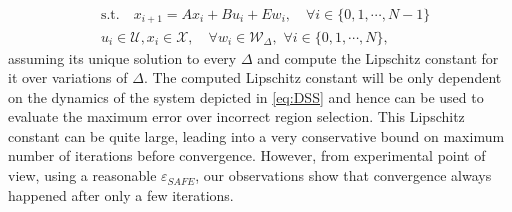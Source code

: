 {\begin{align*}
&\text{s.t.} \quad x_{i+1}=Ax_i+Bu_i + E w_i, \quad\forall i\in\{0,1,\cdots,N-1\}\nonumber\\
&u_i\in\mathcal{U},x_i\in\mathcal{X},\quad \forall w_i\in\mathcal{W}_{\Delta},\,\,\forall i\in\{0,1,\cdots,N\},
\end{align*}
 assuming its unique solution to every $\Delta$ and compute the Lipschitz constant for it over variations of $\Delta$. The computed Lipschitz constant will be only dependent on the dynamics of the system depicted in \autoref{eq:DSS} and hence can be used to evaluate the maximum error over incorrect region selection. This Lipschitz constant can be quite large, leading into a very conservative bound on maximum number of iterations before convergence. However, from experimental point of view, using a reasonable $\varepsilon_{SAFE}$, our observations show that convergence always happened after only a few iterations.
}
